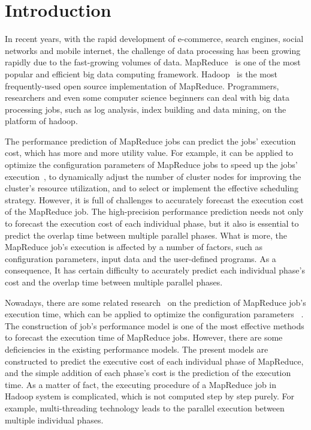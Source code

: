 \section{Introduction}
In recent years, with the rapid development of e-commerce, search engines, social networks and mobile internet,
the challenge of data processing has been growing rapidly due to the fast-growing volumes of data.
MapReduce~\cite{Dean2004MapReduce} is one of the most popular and efficient big data computing framework.
Hadoop~\cite{White2010Hadoop} is the most frequently-used open source implementation of MapReduce.
Programmers, researchers and even some computer science beginners can deal with big data processing jobs, such as log analysis, index building and data mining, on the platform of hadoop.

The performance prediction of MapReduce jobs can predict the jobs' execution cost, which has more and more utility value. For example, it can be applied to optimize the configuration parameters of MapReduce jobs to speed up the jobs' execution~\cite{Herodotou2011Profiling, Shi2014MRTuner, Li2014MRONLINE}, to dynamically adjust the number of cluster nodes for improving the cluster's resource utilization, and to select or implement the effective scheduling strategy. However, it is full of challenges to accurately forecast the execution cost of the MapReduce job. The high-precision performance prediction needs not only to forecast the execution cost of each individual phase, but it also is essential to predict the overlap time between multiple parallel phases. What is more, the MapReduce job's execution is affected by a number of factors, such as configuration parameters, input data and the user-defined programs. As a consequence, It has certain difficulty to accurately predict each individual phase's cost and  the overlap time between multiple parallel phases.

Nowadays, there are some related research~\cite{Herodotou2011Profiling, Shi2014MRTuner, Herodotou2011Hadoop} on the prediction of MapReduce job's execution time, which can be applied to optimize the configuration parameters ~\cite{Herodotou2011No}.  The construction of job's performance model is one of the most effective methods to forecast the execution time of MapReduce jobs. However, there are some deficiencies in the existing performance models. The present models are constructed to predict the executive cost of each individual phase of MapReduce, and the simple addition of each phase's cost is the prediction of the execution time. As a matter of fact, the executing procedure of a MapReduce job in Hadoop system is complicated, which is not computed step by step purely. For example, multi-threading technology leads to the parallel execution between multiple individual phases.

